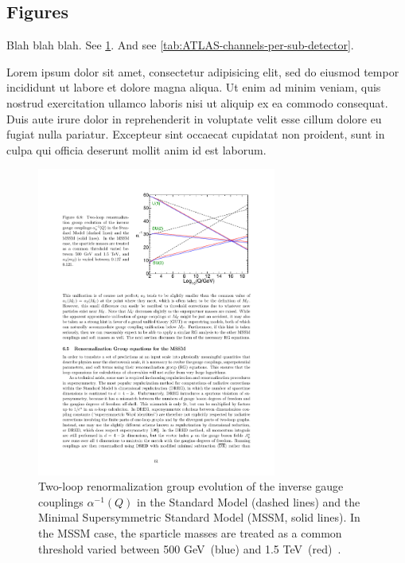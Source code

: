 \subsection{Figures}

Blah blah blah. See \cref{fig:example/Martin-SUSY-running-of-couplings}.
And see \cref{tab:ATLAS-channels-per-sub-detector}.

Lorem ipsum dolor sit amet, consectetur adipisicing elit, sed do eiusmod tempor
incididunt ut labore et dolore magna aliqua. Ut enim ad minim veniam, quis
nostrud exercitation ullamco laboris nisi ut aliquip ex ea commodo consequat.
Duis aute irure dolor in reprehenderit in voluptate velit esse cillum dolore
eu fugiat nulla pariatur. Excepteur sint occaecat cupidatat non proident, sunt
in culpa qui officia deserunt mollit anim id est laborum.


\begin{figure}[tp]
    \centering
    \includegraphics[width=0.70\textwidth]{figs/example/Martin-SUSY-running-of-couplings}
    \caption{
        Two-loop renormalization group evolution of the inverse
        gauge couplings $\alpha^{-1}(Q)$ in the Standard Model (dashed lines)
        and the Minimal Supersymmetric Standard Model  (MSSM, solid lines).
        In the MSSM case, the sparticle masses are treated as a common threshold varied
        between 500 GeV~(blue) and 1.5 TeV~(red)~\citep{1997.Martin.SUSY-primer}.
    }   
    \label{fig:example/Martin-SUSY-running-of-couplings}
\end{figure}

